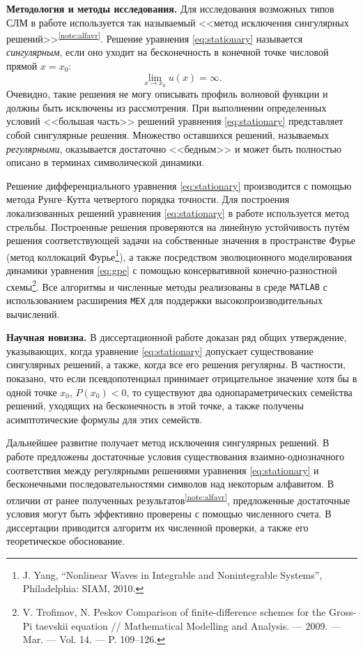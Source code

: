 \documentclass[candidate, href, colorlinks]{disser}
\begin{document}
\textbf{Методология и методы исследования.}
Для исследования возможных типов СЛМ в работе используется так называемый <<метод исключения сингулярных решений>>\textsuperscript{\ref{note:alfavr}}.
Решение уравнения \eqref{eq:stationary} называется {\it сингулярным}, если оно уходит на бесконечность в конечной точке числовой прямой $x = x_0$:
\begin{equation}
	\lim \limits_{x \to x_0} u(x) = \infty.
\end{equation}
Очевидно, такие решения не могу описывать профиль волновой функции и должны быть исключены из рассмотрения.
При выполнении определенных условий <<большая часть>> решений уравнения \eqref{eq:stationary} представляет собой сингулярные решения.
Множество оставшихся решений, называемых {\it регулярными}, оказывается достаточно <<бедным>> и может быть полностью описано в терминах символической динамики.

Решение дифференциального уравнения \eqref{eq:stationary} производится с помощью метода Рунге--Кутта четвертого порядка точности.
Для построения локализованных решений уравнения \eqref{eq:stationary} в работе используется метод стрельбы.
Построенные решения проверяются на линейную устойчивость путём решения соответствующей задачи на собственные значения в пространстве Фурье (метод коллокаций Фурье\footnote{J. Yang, ``Nonlinear Waves in Integrable and Nonintegrable Systems'', Philadelphia: SIAM, 2010.}), а также посредством эволюционного моделирования динамики уравнения \eqref{eq:gpe} с помощью консервативной конечно-разностной схемы\footnote{V. Trofimov, N. Peskov Comparison of finite-difference schemes for the Gross-Pi­ taevskii equation // Mathematical Modelling and Analysis. — 2009. — Mar. — Vol. 14. — P. 109–126.}.
Все алгоритмы и численные методы реализованы в среде {\tt MATLAB} с использованием расширения {\tt MEX} для поддержки высокопроизводительных вычислений.

\textbf{Научная новизна.}
В диссертационной работе доказан ряд общих утверждение, указывающих, когда уравнение \eqref{eq:stationary} допускает существование сингулярных решений, а также, когда все его решения регулярны.
В частности, показано, что если псевдопотенциал принимает отрицательное значение хотя бы в одной точке $x_0$, $P(x_0) < 0$, то существуют два однопараметрических семейства решений, уходящих на бесконечность в этой точке, а также получены асимптотические формулы для этих семейств.

Дальнейшее развитие получает метод исключения сингулярных решений.
В работе предложены достаточные условия существования взаимно-однозначного соответствия между регулярными решениями уравнения \eqref{eq:stationary} и бесконечными последовательностями символов над некоторым алфавитом.
В отличии от ранее полученных результатов\textsuperscript{\ref{note:alfavr}}, предложенные достаточные условия могут быть эффективно проверены с помощью численного счета.
В диссертации приводится алгоритм их численной проверки, а также его теоретическое обоснование.
\end{document}
